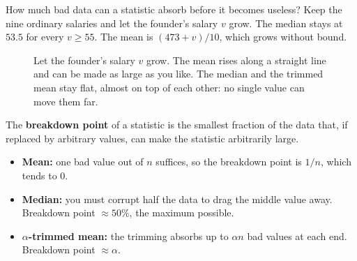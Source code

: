 How much bad data can a statistic absorb before it becomes useless? Keep the nine
ordinary salaries and let the founder's salary $v$ grow. The median stays at
$53.5$ for every $v \ge 55$. The mean is $(473+v)/10$, which grows without bound.

\begin{figure}[H]
\centering
{}
\caption{Let the founder's salary $v$ grow. The mean rises along a straight line and
can be made as large as you like. The median and the trimmed mean stay flat, almost on
top of each other: no single value can move them far.}
\label{fig:center-spread-breakdown}
\end{figure}

\begin{definition}
The \textbf{breakdown point} of a statistic is the smallest fraction of the data
that, if replaced by arbitrary values, can make the statistic arbitrarily large.
\end{definition}

\begin{itemize}
  \item \textbf{Mean:} one bad value out of $n$ suffices, so the breakdown point is
  $1/n$, which tends to $0$.
  \item \textbf{Median:} you must corrupt half the data to drag the middle value
  away. Breakdown point $\approx 50\%$, the maximum possible.
  \item \textbf{$\alpha$-trimmed mean:} the trimming absorbs up to $\alpha n$ bad
  values at each end. Breakdown point $\approx \alpha$.
\end{itemize}

